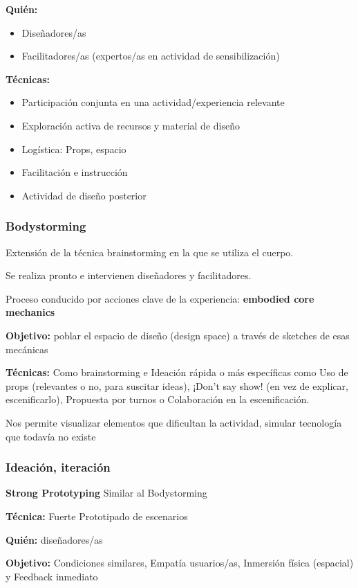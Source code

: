 \documentclass[12pt]{report} %
\begin{document}
\textbf{Quién:}
\begin{itemize}
  \item Diseñadores/as
  \item Facilitadores/as (expertos/as en actividad de sensibilización)
\end{itemize}

\textbf{Técnicas:}
\begin{itemize}
  \item Participación conjunta en una actividad/experiencia relevante
  \item Exploración activa de recursos y material de diseño
  \item Logística: Props, espacio
  \item Facilitación e instrucción
  \item Actividad de diseño posterior
\end{itemize}

\subsubsection{Bodystorming}

Extensión de la técnica brainstorming en la que se utiliza el cuerpo. 

Se realiza pronto e intervienen diseñadores y facilitadores.

Proceso conducido por acciones clave de la experiencia: \textbf{embodied core mechanics}

\textbf{Objetivo:} poblar el espacio de diseño (design space) a través de sketches de esas mecánicas

\textbf{Técnicas:} Como brainstorming e Ideación rápida o más específicas como Uso de props (relevantes o no, para suscitar ideas), ¡Don’t say show! (en vez de explicar, escenificarlo), Propuesta por turnos o Colaboración en la escenificación.

Nos permite visualizar elementos que dificultan la actividad, simular tecnología que todavía no existe

\subsubsection{Ideación, iteración}
\textbf{Strong Prototyping} Similar al Bodystorming

\textbf{Técnica:} Fuerte Prototipado de escenarios

\textbf{Quién:} diseñadores/as

\textbf{Objetivo:} Condiciones similares, Empatía usuarios/as, Inmersión física (espacial) y Feedback inmediato
\end{document}
